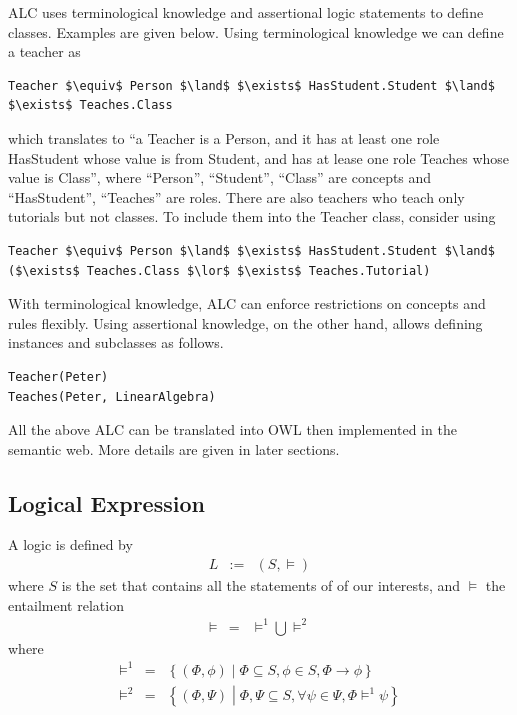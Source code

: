 ALC uses terminological knowledge and assertional logic statements to define classes. Examples are given below. Using terminological knowledge we can define a teacher as
\begin{lstlisting}[mathescape=true]
	Teacher $\equiv$ Person $\land$ $\exists$ HasStudent.Student $\land$ $\exists$ Teaches.Class
\end{lstlisting}
which translates to ``a Teacher is a Person, and it has at least one role HasStudent whose value is from Student, and has at lease one role Teaches whose value is Class'', where ``Person'', ``Student'', ``Class'' are concepts and ``HasStudent'', ``Teaches'' are roles. There are also teachers who teach only tutorials but not classes. To include them into the Teacher class, consider using
\begin{lstlisting}[mathescape=true]
Teacher $\equiv$ Person $\land$ $\exists$ HasStudent.Student $\land$ ($\exists$ Teaches.Class $\lor$ $\exists$ Teaches.Tutorial)
\end{lstlisting}
With terminological knowledge, ALC can enforce restrictions on concepts and rules flexibly. Using assertional knowledge, on the other hand, allows defining instances and subclasses as follows.
\begin{lstlisting}
Teacher(Peter)
Teaches(Peter, LinearAlgebra)
\end{lstlisting}

All the above ALC can be translated into OWL then implemented in the semantic web. More details are given in later sections.

\subsection{Logical Expression}

A logic is defined by 
\begin{eqnarray}
	L&:=& (S, \models) \nonumber
\end{eqnarray}
where $S$ is the set that contains all the statements of of our interests, and $\models$ the entailment relation
\begin{eqnarray}
	\models &=& \models^1 \bigcup \models^2 \nonumber
\end{eqnarray}
where
\begin{eqnarray}
	\models^1 &=& \left\{(\Phi,\phi)\middle| \Phi \subseteq S, \phi\in S, \Phi\rightarrow \phi\right\} \label{eq:logicentailment} \\
	\models^2 &=& \left\{(\Phi, \Psi)\middle| \Phi, \Psi \subseteq S, \forall \psi \in \Psi, \Phi \models^1 \psi \right\} \label{eq:compoundlogicentailment}
\end{eqnarray}

